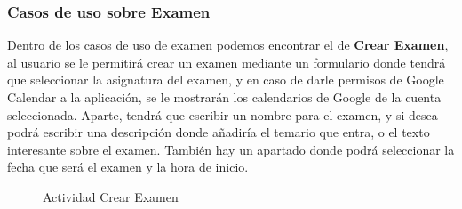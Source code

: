 \subsubsection{Casos de uso sobre Examen}
\label{subsubsecc:Casos de uso sobre Examen}
Dentro de los casos de uso de examen podemos encontrar el de \textbf{Crear Examen}, al usuario se le permitirá crear un examen mediante un formulario donde tendrá que seleccionar la asignatura del examen, y en caso de darle permisos de Google Calendar a la aplicación, se le mostrarán los calendarios de Google de la cuenta seleccionada.
Aparte, tendrá que escribir un nombre para el examen,  y si desea podrá escribir una descripción donde añadiría el temario que entra, o el texto interesante sobre el examen.
También hay un apartado donde podrá seleccionar la fecha que será el examen y la hora de inicio.
\begin{figure} 
  \begin{center} 
    \caption{Actividad Crear Examen} 
    \label{fig:crearExamen} 
  \end{center} 
\end{figure}
